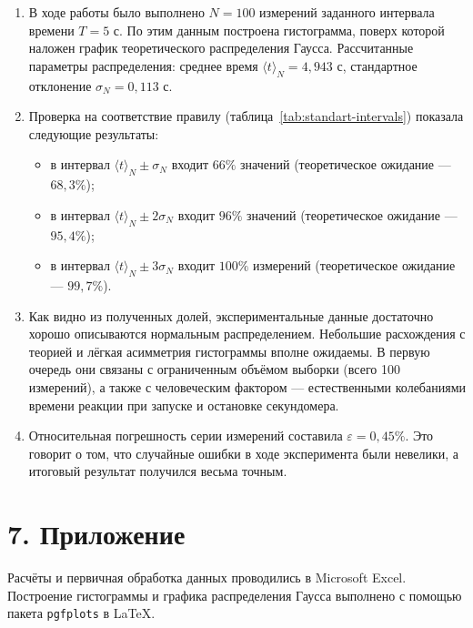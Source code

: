 \documentclass[a4paper,12pt]{article}
\begin{document}
\begin{enumerate}
    \item В ходе работы было выполнено $N = 100$ измерений заданного интервала времени $T = 5\text{ с}$. По этим данным построена гистограмма, поверх которой наложен график теоретического распределения Гаусса. Рассчитанные параметры распределения: среднее время $\langle t\rangle_N = 4{,}943\text{ с}$, стандартное отклонение $\sigma_N = 0{,}113\text{ с}$.
    
    \item Проверка на соответствие правилу (таблица~\ref{tab:standart-intervals}) показала следующие результаты:
    \begin{itemize}
        \item в интервал $\langle t\rangle_N \pm \sigma_N$ входит $66\%$ значений (теоретическое ожидание — $68{,}3\%$);
        \item в интервал $\langle t\rangle_N \pm 2\sigma_N$ входит $96\%$ значений (теоретическое ожидание — $95{,}4\%$);
        \item в интервал $\langle t\rangle_N \pm 3\sigma_N$ входит $100\%$ измерений (теоретическое ожидание — $99{,}7\%$).
    \end{itemize}
    
    \item Как видно из полученных долей, экспериментальные данные достаточно хорошо описываются нормальным распределением. Небольшие расхождения с теорией и лёгкая асимметрия гистограммы вполне ожидаемы. В первую очередь они связаны с ограниченным объёмом выборки (всего 100 измерений), а также с человеческим фактором — естественными колебаниями времени реакции при запуске и остановке секундомера.
    
    \item Относительная погрешность серии измерений составила $\varepsilon = 0{,}45\%$. Это говорит о том, что случайные ошибки в ходе эксперимента были невелики, а итоговый результат получился весьма точным.
\end{enumerate}

\vspace{1cm}

\section*{\hspace{30pt} 7. Приложение}

Расчёты и первичная обработка данных проводились в Microsoft Excel. Построение гистограммы и графика распределения Гаусса выполнено с помощью пакета \texttt{pgfplots} в \LaTeX.
\end{document}
